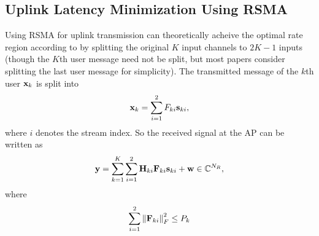 \documentclass[a4paper, 12pt, onecolumn, journal, twoside, draftclsnofoot]{IEEEtran}
\begin{document}
\subsection{Uplink Latency Minimization Using RSMA}
Using RSMA for uplink transmission can theoretically acheive the optimal rate region according to \cite{rimoldi1996} by splitting the original $K$ input channels to $2K-1$ inputs (though the $K$th user message need not be split, but most papers consider splitting the last user message for simplicity).  The transmitted message of the $k$th user ${\bf x}_k$ is split into 
\begin{equation*}
	{\bf x}_k = \sum_{i=1}^2  \\F_{ki} {\bf s}_{ki},
\end{equation*}
where $i$ denotes the stream index.  So the received signal at the AP can be written as
\begin{equation*}
	{\bf y} = \sum_{k=1}^K \sum_{i=1}^2 {\bf H}_{ki} {\bf F}_{ki} {\bf s}_{ki} + {\bf w} \in \mathbb{C}^{N_R},
\end{equation*}
where
\begin{equation*}
    \sum_{i=1}^2 \left\| {\bf F}_{ki} \right\|_F^2  \leq P_k
\end{equation*}
\end{document}
